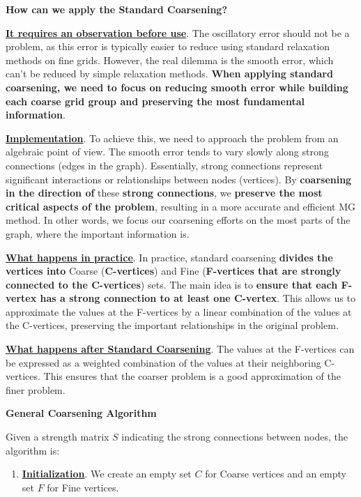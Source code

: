 \begin{enumerate}
    \begin{flushleft}
    	\textcolor{Green3}{ \textbf{How can we apply the Standard Coarsening?}}
    \end{flushleft}
    \textbf{\underline{It requires an observation before use}}. The oscillatory error should not be a problem, as this error is typically easier to reduce using standard relaxation methods on fine grids. However, the real dilemma is the smooth error, which can't be reduced by simple relaxation methods. \textbf{When applying standard coarsening, we need to focus on reducing smooth error while building each coarse grid group and preserving the most fundamental information}.
    
    \textbf{\underline{Implementation}}. To achieve this, we need to approach the problem from an algebraic point of view. The smooth error tends to vary slowly along strong connections (edges in the graph). Essentially, strong connections represent significant interactions or relationships between nodes (vertices). By \textbf{coarsening in the direction of} these \textbf{strong connections}, we \textbf{preserve the most critical aspects of the problem}, resulting in a more accurate and efficient MG method. In other words, we focus our coarsening efforts on the most  parts of the graph, where the important information is.
    
    \textbf{\underline{What happens in practice}}. In practice, standard coarsening \textbf{divides the vertices into} Coarse (\textbf{C-vertices}) and Fine (\textbf{F-vertices that are strongly connected to the C-vertices}) sets. The main idea is to \textbf{ensure that each F-vertex has a strong connection to at least one C-vertex}. This allows us to approximate the values at the F-vertices by a linear combination of the values at the C-vertices, preserving the important relationships in the original problem.
    
    \textbf{\underline{What happens after Standard Coarsening}}. The values at the F-vertices can be expressed as a weighted combination of the values at their neighboring C-vertices. This ensures that the coarser problem is a good approximation of the finer problem.
    
    \newpage
    
    \begin{flushleft}
    	\textcolor{Green3}{ \textbf{General Coarsening Algorithm}}
    \end{flushleft}
    Given a strength matrix $S$ indicating the strong connections between nodes, the algorithm is:
    \begin{enumerate}
    	\item \textbf{\underline{Initialization}}. We create an empty set $C$ for Coarse vertices and an empty set $F$ for Fine vertices.
    	

\end{enumerate}
\end{enumerate}
